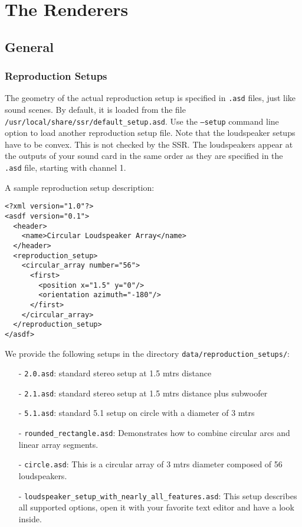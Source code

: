 \section{The Renderers}
\label{sec:renderers}

\subsection{General}

\subsubsection{Reproduction Setups}
\label{sec:reproduction_setups}

The geometry of the actual reproduction setup is specified in
\texttt{.asd} files, just like sound scenes. By default, it is loaded from the
file \texttt{/usr/local/share/ssr/default\_setup.asd}.
Use the \texttt{--setup} command line option to load another reproduction setup file.
Note that the
loudspeaker setups have to be convex. This is not checked by the SSR.
The loudspeakers appear at the outputs of your sound card in the same
order as they are specified in the \texttt{.asd} file, starting with channel 1.

\noindent A sample reproduction setup description:

\begin{verbatim}
<?xml version="1.0"?>
<asdf version="0.1">
  <header>
    <name>Circular Loudspeaker Array</name>
  </header>
  <reproduction_setup>
    <circular_array number="56">
      <first>
        <position x="1.5" y="0"/>
        <orientation azimuth="-180"/>
      </first>
    </circular_array>
  </reproduction_setup>
</asdf>
\end{verbatim}

\noindent We provide the following setups in the directory
\verb+data/reproduction_setups/+:
\begin{itemize}
\item[-] \texttt{2.0.asd}: standard stereo setup at 1.5 mtrs distance
\item[-] \texttt{2.1.asd}: standard stereo setup at 1.5 mtrs distance plus subwoofer
\item[-] \texttt{5.1.asd}: standard 5.1 setup on circle with a diameter of 3 mtrs
\item[-] \texttt{rounded\_rectangle.asd}: Demonstrates how to combine circular
	arcs and linear array segments.
\item[-] \texttt{circle.asd}: This is a circular array of 3 mtrs diameter
	composed of 56 loudspeakers.
\item[-] \texttt{loudspeaker\_setup\_with\_nearly\_all\_features.asd}: This
	setup describes all supported options, open it with your favorite text
	editor and have a look inside.
\end{itemize}

